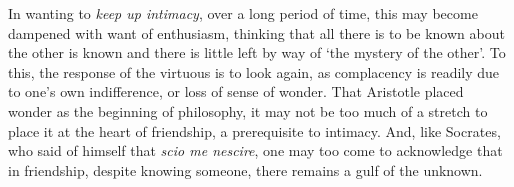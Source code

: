 \documentclass[a4paper,10pt]{article}
\begin{document}
In wanting to \emph{keep up intimacy}, over a long period of time, this may become dampened with want of enthusiasm, thinking that all there is to be known about the other is known and there is little left by way of `the mystery of the other'. To this, the response of the virtuous is to look again, as complacency is readily due to one's own indifference, or loss of sense of wonder. That Aristotle placed wonder as the beginning of philosophy, it may not be too much of a stretch to place it at the heart of friendship, a prerequisite to intimacy. And, like Socrates, who said of himself that \emph{scio me nescire}, one may too come to acknowledge that in friendship, despite knowing someone, there remains a gulf of the unknown.
\end{document}
